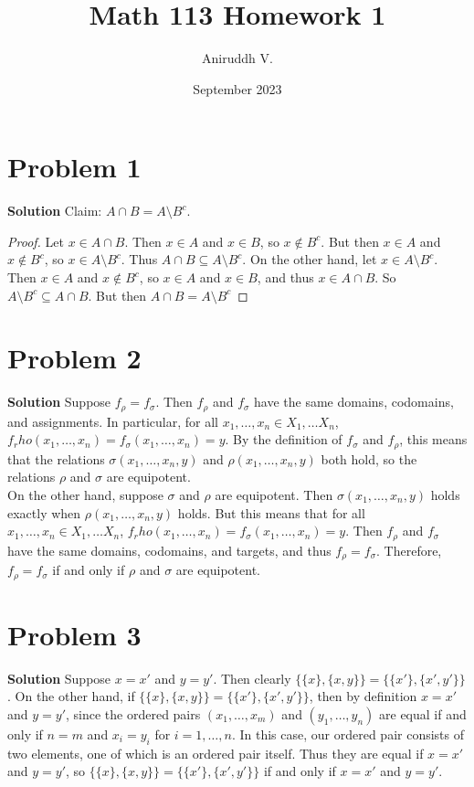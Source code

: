 \documentclass{article}
\title{Math 113 Homework 1}
\author{Aniruddh V.}
\date{September 2023}
\begin{document}
\maketitle

\section{Problem 1}
\textbf{Solution} Claim: $A \cap B = A \setminus B^c$.
\begin{proof}
Let $x \in A \cap B$. Then $x \in A$ and $x \in B$, so $x \not\in B^c$. But then $x \in A$ and $x \not\in B^c$, so $x \in A \setminus B^c$. Thus $A \cap B \subseteq A \setminus B^c$. 
On the other hand, let $x \in A \setminus B^c$. Then $x \in A$ and $x \not\in B^c$, so $x \in A$ and $x \in B$, and thus $x \in A \cap B$. So $A \setminus B^c \subseteq A \cap B$. But
then $A \cap B = A \setminus B^c$
\end{proof}



\section{Problem 2}
\textbf{Solution } Suppose $f_\rho = f_\sigma$. Then $f_\rho$ and $f_\sigma$ have the same domains, codomains, and assignments. In particular, for all $x_1, \ldots, x_n \in X_1, \ldots X_n$,
$f_rho(x_1, \ldots, x_n) = f_\sigma(x_1, \ldots, x_n) = y$. By the definition of $f_\sigma$ and $f_\rho$, this means that the relations $\sigma(x_1, \ldots, x_n, y)$ and $\rho(x_1, \ldots, x_n, y)$
both hold, so the relations $\rho$ and $\sigma$ are equipotent. \\
On the other hand, suppose $\sigma$ and $\rho$ are equipotent. Then $\sigma(x_1, \ldots, x_n, y)$ holds exactly when $\rho(x_1, \ldots, x_n, y)$ holds. But this means that for all $x_1, \ldots, x_n \in X_1, \ldots X_n$,
$f_rho(x_1, \ldots, x_n) = f_\sigma(x_1, \ldots, x_n) = y$. Then $f_\rho$ and $f_\sigma$ have the same domains, codomains, and targets, and thus $f_\rho = f_\sigma$. Therefore, $f_\rho = f_\sigma$ if 
and only if $\rho$ and $\sigma$ are equipotent.


\section{Problem 3}

\textbf{Solution } Suppose $x = x'$ and $y = y'$. Then clearly $\{ \{x\}, \{x, y\} \} = \{ \{x'\}, \{x', y'\} \}$. On the other hand, if $\{ \{x\}, \{x, y\}\}  = \{ \{x'\}, \{x', y'\} \}$,
then by definition $x = x'$ and $y = y'$, since the ordered pairs $(x_1, \ldots, x_m)$ and $(y_1, \ldots, y_n)$ are equal if and only if $n = m$ and $x_i = y_i$ for $i = 1, \ldots, n$. In this case,
our ordered pair consists of two elements, one of which is an ordered pair itself. Thus they are equal if $x = x'$ and $y = y'$, so $\{ \{x\}, \{x, y\} \} = \{ \{x'\}, \{x', y'\} \}$ if and only if 
$x = x'$ and $y = y'$.
\end{document}
